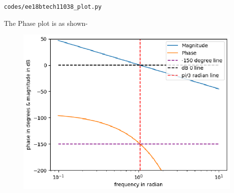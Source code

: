 \begin{enumerate}[label=\thesubsection.\arabic*.,ref=\thesubsection.\theenumi]
\begin{lstlisting}
codes/ee18btech11038_plot.py
\end{lstlisting}
The Phase plot is as shown-
\begin{figure}[!h]
  \includegraphics[width=\columnwidth]{./figs/ee18btech11038_graph.eps}
  \caption{}
  \label{fig:ee18btech11038_graph}
\end{figure}

\end{enumerate}
